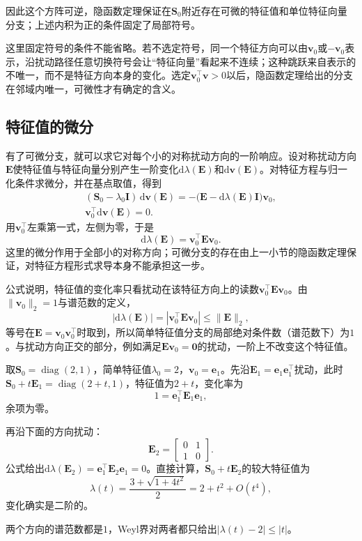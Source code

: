 因此这个方阵可逆，隐函数定理保证在$\bm S_0$附近存在可微的特征值和单位特征向量分支；上述内积为正的条件固定了局部符号。

这里固定符号的条件不能省略。若不选定符号，同一个特征方向可以由$\bm v_0$或$-\bm v_0$表示，沿扰动路径任意切换符号会让“特征向量”看起来不连续；这种跳跃来自表示的不唯一，而不是特征方向本身的变化。选定$\bm v_0^\top\bm v>0$以后，隐函数定理给出的分支在邻域内唯一，可微性才有确定的含义。

\subsection{特征值的微分}
\label{sec:multivariable-eigenvalue-differential}

有了可微分支，就可以求它对每个小的对称扰动方向的一阶响应。设对称扰动方向$\bm E$使特征值与特征向量分别产生一阶变化$\mathrm d\lambda(\bm E)$和$\mathrm d\bm v(\bm E)$。对特征方程与归一化条件求微分，并在基点取值，得到
\begin{equation}
 \begin{gathered}
(\bm S_0-\lambda_0\bm I)\,\mathrm d\bm v(\bm E)
 =-\bigl(\bm E-\mathrm d\lambda(\bm E)\bm I\bigr)\bm v_0,\\
\bm v_0^\top\mathrm d\bm v(\bm E)=0.
 \end{gathered}
 \label{eq:multivariable-eigen-differential-system}
\end{equation}
用$\bm v_0^\top$左乘第一式，左侧为零，于是
\begin{equation}
 \mathrm d\lambda(\bm E)=\bm v_0^\top\bm E\bm v_0.
\label{eq:multivariable-eigenvalue-differential}
\end{equation}
这里的微分作用于全部小的对称方向；可微分支的存在由上一小节的隐函数定理保证，对特征方程形式求导本身不能承担这一步。

公式说明，特征值的变化率只看扰动在该特征方向上的读数$\bm v_0^\top\bm E\bm v_0$。由$\lVert\bm v_0\rVert_2=1$与谱范数的定义，
\[
 |\mathrm d\lambda(\bm E)|=|\bm v_0^\top\bm E\bm v_0|\leq\lVert\bm E\rVert_2 ,
\]
等号在$\bm E=\bm v_0\bm v_0^\top$时取到，所以简单特征值分支的局部绝对条件数（谱范数下）为$1$。与扰动方向正交的部分，例如满足$\bm E\bm v_0=\bm0$的扰动，一阶上不改变这个特征值。
\begin{example}[特征值沿两个方向的变化]
\label{ex:multivariable-eigenvalue-direction-check}
取$\bm S_0=\operatorname{diag}(2,1)$，简单特征值$\lambda_0=2$，$\bm v_0=\bm e_1$。先沿$\bm E_1=\bm e_1\bm e_1^\top$扰动，此时$\bm S_0+t\bm E_1=\operatorname{diag}(2+t,1)$，特征值为$2+t$，变化率为
\[
 1=\bm e_1^\top\bm E_1\bm e_1 ,
\]
余项为零。

再沿下面的方向扰动：
\[
 \bm E_2=\begin{bmatrix}0&1\\1&0\end{bmatrix}.
\]
公式给出$\mathrm d\lambda(\bm E_2)=\bm e_1^\top\bm E_2\bm e_1=0$。直接计算，$\bm S_0+t\bm E_2$的较大特征值为
\[
 \lambda(t)=\frac{3+\sqrt{1+4t^2}}2=2+t^2+O(t^4),
\]
变化确实是二阶的。

两个方向的谱范数都是$1$，Weyl界对两者都只给出$|\lambda(t)-2|\leq|t|$。
\end{example}

